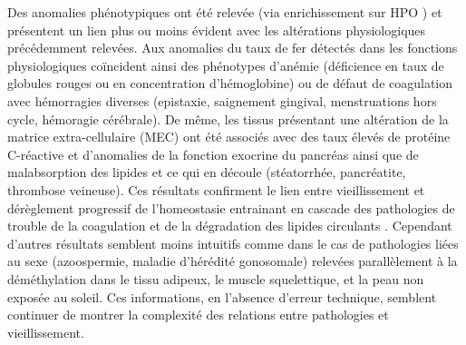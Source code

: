 Des anomalies phénotypiques ont été relevée (via enrichissement sur HPO \cite{Kohler2019}) et présentent un lien plus ou moins évident avec les altérations physiologiques précédemment relevées. Aux anomalies du taux de fer détectés dans les fonctions physiologiques coïncident ainsi des phénotypes d'anémie (déficience en taux de globules rouges ou en concentration d'hémoglobine) ou de défaut de coagulation avec hémorragies diverses (epistaxie, saignement gingival, menstruations hors cycle, hémoragie cérébrale). De même, les tissus présentant une altération de la matrice extra-cellulaire (MEC) ont été associés avec des taux élevés de protéine C-réactive et d'anomalies de la fonction exocrine du pancréas ainsi que de malabsorption des lipides et ce qui en découle (stéatorrhée, pancréatite, thrombose veineuse). Ces résultats confirment le lien entre vieillissement et dérèglement progressif de l'homeostasie entrainant en cascade des pathologies de trouble de la coagulation \cite{Franchini2006,Kario1993} et de la dégradation des lipides circulants \cite{Yamamoto2014, Hirschfield2003}. Cependant d'autres résultats semblent moins intuitifs comme dans le cas de pathologies liées au sexe (azoospermie, maladie d'hérédité gonosomale) relevées parallèlement à la déméthylation dans le tissu adipeux, le muscle squelettique, et la peau non exposée au soleil. Ces informations, en l'absence d'erreur technique, semblent continuer de montrer la complexité des relations entre pathologies et vieillissement.

